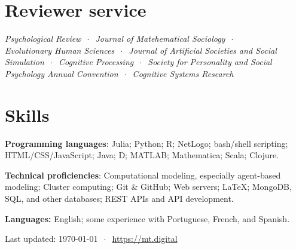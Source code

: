 \documentclass[11pt, letterpaper]{article}
\begin{document}
\section*{Reviewer service}

\emph{Psychological Review} $~\cdot~$ \emph{Journal of Matehematical Sociology} $~\cdot~$ \\
\emph{Evolutionary Human Sciences} $~\cdot~$ \emph{Journal of Artificial Societies and Social Simulation} $~\cdot~$ \emph{Cognitive Processing} $~\cdot~$ \emph{Society for Personality and Social Psychology Annual Convention} $~\cdot~$ \emph{Cognitive Systems Research}

\section*{Skills}

  \textbf{Programming languages}: Julia; Python; R; NetLogo; bash/shell scripting; 
  HTML/CSS/JavaScript; Java; D; MATLAB; Mathematica; Scala; Clojure.

  \textbf{Technical proficiencies}: Computational 
  modeling, especially agent-based modeling; Cluster computing;
  Git \& GitHub; Web servers; \LaTeX; MongoDB, SQL, and other databases; 
  REST APIs and API development.

  \textbf{Languages:} English; some experience with Portuguese, French,
  and Spanish.

\vfill
\hrulefill

\begin{center}
  {\scriptsize  Last updated: \today\- $~\cdot~$ \- 
\href{mt.digital}{https://mt.digital}}
\end{center}
\end{document}
